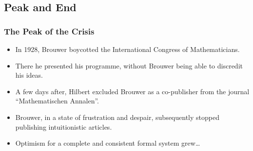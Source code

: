 \documentclass{beamer}
\begin{document}
\subsection{Peak and End}
\begin{frame}
    \frametitle{The Peak of the Crisis}
    \begin{itemize}[<+->]
	\item In 1928, Brouwer boycotted the International Congress of Mathematicians.
	\item There he presented his programme, without Brouwer being able to discredit his ideas.
	\item A few days after, Hilbert excluded Brouwer as a co-publisher from the journal ``Mathematischen Annalen''.
	\item Brouwer, in a state of frustration and despair, subsequently stopped publishing intuitionistic articles.
	\item Optimism for a complete and consistent formal system grew\ldots
    \end{itemize}
\end{frame}
\end{document}
